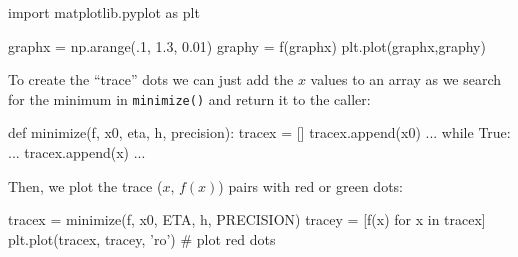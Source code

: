 \documentclass[titlepage]{tufte-book}
\begin{document}
\begin{fullwidth}
\begin{pyverbatim}
import matplotlib.pyplot as plt

graphx = np.arange(.1, 1.3, 0.01)
graphy = f(graphx)
plt.plot(graphx,graphy)
\end{pyverbatim}

To create the ``trace'' dots we can just add the $x$ values to an array as we search for the minimum in {\tt minimize()} and return it to the caller:

\begin{pyverbatim}
def minimize(f, x0, eta, h, precision):
    tracex = []
    tracex.append(x0)
    ...
    while True:
        ...
        tracex.append(x)
        ...
\end{pyverbatim}

Then, we plot the trace ($x$, $f(x)$) pairs with red or green dots:

\begin{pyverbatim}
tracex = minimize(f, x0, ETA, h, PRECISION)
tracey = [f(x) for x in tracex]
plt.plot(tracex, tracey, 'ro') # plot red dots
\end{pyverbatim}
 
\end{fullwidth}
\end{document}
